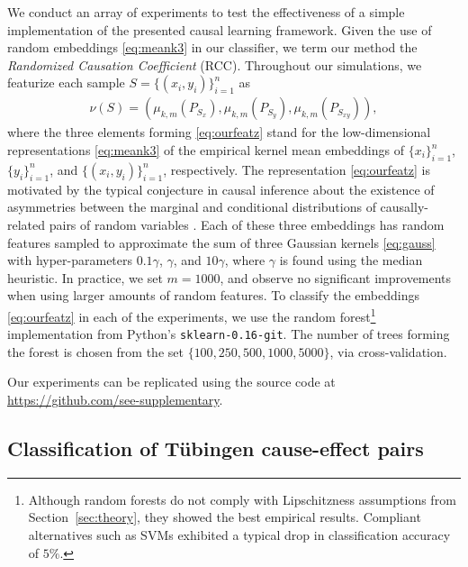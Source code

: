 \documentclass{article}
\begin{document}
We conduct an array of experiments to test the effectiveness of a simple implementation 
of the presented causal learning framework.  Given the use of random embeddings 
\eqref{eq:meank3} in our classifier, we term our
method the \emph{Randomized Causation Coefficient} (RCC).  Throughout our
simulations, we featurize each sample $S =
\{(x_{i},y_{i})\}_{i=1}^{n}$ as
\begin{align}\label{eq:ourfeatz}
  \nu(S) = (\mu_{k,m}(P_{S_x}), \mu_{k,m}(P_{S_y}), \mu_{k,m}(P_{S_{xy}})),
\end{align}
where the three elements forming \eqref{eq:ourfeatz} stand for the
low-dimensional representations \eqref{eq:meank3} of the empirical kernel mean
embeddings of $\{x_i\}_{i=1}^n$, $\{y_i\}_{i=1}^n$, and
$\{(x_i,y_i)\}_{i=1}^n$, respectively. The representation \eqref{eq:ourfeatz}
is motivated by the typical conjecture in causal inference about the existence
of asymmetries between the marginal and conditional distributions of
causally-related pairs of random variables \citep{Scholkopf12:Causal}. Each of
these three embeddings has random features sampled to approximate the sum of
three Gaussian kernels \eqref{eq:gauss} with hyper-parameters $0.1\gamma$,
$\gamma$, and $10\gamma$, where $\gamma$ is found using the median heuristic.
In practice, we set $m = 1000$, and observe no significant improvements when
using larger amounts of random features. To classify the embeddings
\eqref{eq:ourfeatz} in each of the experiments, we use the random
forest\footnote{Although random forests do not comply with Lipschitzness
assumptions from Section~\ref{sec:theory}, they showed the best empirical results.
Compliant alternatives such as SVMs exhibited a typical drop in classification
accuracy of $5\%$.} implementation from Python's \texttt{sklearn-0.16-git}. The
number of trees forming the forest is chosen from the set
$\{100,250,500,1000,5000\}$, via cross-validation.

Our experiments can be replicated using the source code 
at {\small\url{https://github.com/see-supplementary}}.

\subsection{Classification of T\"ubingen cause-effect pairs}\label{sec:tuebingen}
\end{document}
